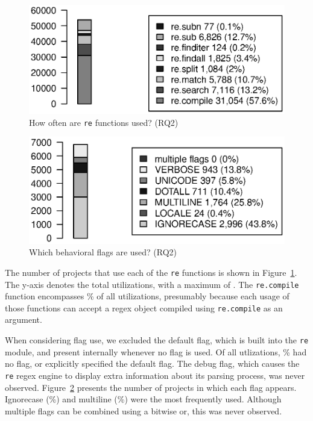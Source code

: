 \begin{figure}[tb]
\centering
\includegraphics[width=\columnwidth]{../analysis_output/partFunctions.eps}
\vspace{-6pt}
\caption{How often are  {\tt re} functions used? (RQ2)}
\vspace{-6pt}
\label{fig:partFunctions}
\end{figure}

\begin{figure}[tb]
\centering
\includegraphics[width=0.9\columnwidth]{../analysis_output/partFlags.eps}
\vspace{-6pt}
\caption{Which behavioral flags are used? (RQ2)}
\label{fig:partFlags}
\end{figure}



The number of projects that use each of the {\tt re} functions is shown in Figure~\ref{fig:partFunctions}.  The y-axis denotes the total utilizations, with a maximum of . The {\tt re.compile} function encompasses \% of all utilizations, presumably because each usage of those functions can accept a regex object compiled using {\tt re.compile} as an argument. 

When considering flag use, we excluded the default flag, which is built into the {\tt re} module, and present internally whenever no flag is used.  Of all utlizations, \% had no flag, or explicitly specified the default flag.  The debug flag, which causes the {\tt re} regex engine to display extra information about its parsing process, was never observed.
 Figure~\ref{fig:partFlags} presents the number of projects in which each flag appears. Ignorecase (\%) and multiline (\%) were the most frequently used.   Although multiple flags can be combined using a bitwise or, this was never observed.

